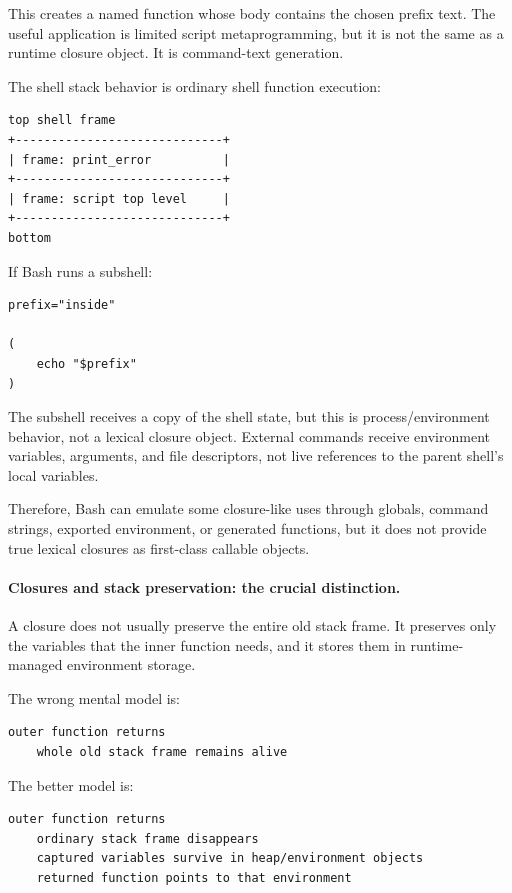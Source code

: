 This creates a named function whose body contains the chosen prefix text. The useful application is limited script metaprogramming, but it is not the same as a runtime closure object. It is command-text generation.

The shell stack behavior is ordinary shell function execution:

\begin{verbatim}
top shell frame
+-----------------------------+
| frame: print_error          |
+-----------------------------+
| frame: script top level     |
+-----------------------------+
bottom
\end{verbatim}

If Bash runs a subshell:

\begin{verbatim}
prefix="inside"

(
    echo "$prefix"
)
\end{verbatim}

The subshell receives a copy of the shell state, but this is process/environment behavior, not a lexical closure object. External commands receive environment variables, arguments, and file descriptors, not live references to the parent shell's local variables.

Therefore, Bash can emulate some closure-like uses through globals, command strings, exported environment, or generated functions, but it does not provide true lexical closures as first-class callable objects.

\paragraph{Closures and stack preservation: the crucial distinction.}

A closure does not usually preserve the entire old stack frame. It preserves only the variables that the inner function needs, and it stores them in runtime-managed environment storage.

The wrong mental model is:

\begin{verbatim}
outer function returns
    whole old stack frame remains alive
\end{verbatim}

The better model is:

\begin{verbatim}
outer function returns
    ordinary stack frame disappears
    captured variables survive in heap/environment objects
    returned function points to that environment
\end{verbatim}

